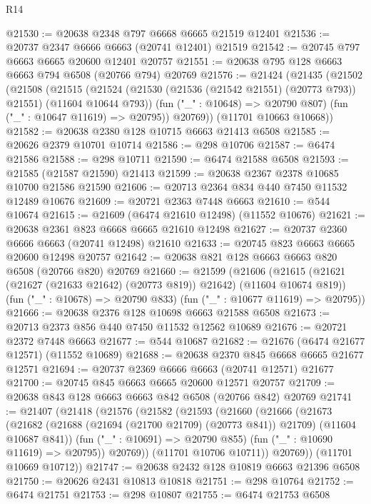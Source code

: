 \begin{lexlean}{R14}
\begin{coremodule}
@21530 := @20638 @2348 @797 @6668 @6665 @21519 @12401
@21536 := @20737 @2347 @6666 @6663 (@20741 @12401) @21519
@21542 := @20745 @797 @6663 @6665 @20600 @12401 @20757
@21551 := @20638 @795 @128 @6663 @6663 @794 @6508 (@20766 @794) @20769
@21576 := @21424
    (@21435
      (@21502
        (@21508
          (@21515
            (@21524 (@21530 (@21536 (@21542 @21551) (@20773 @793)) @21551) (@11604 @10644 @793))
            (fun ("_" : @10648) => @20790 @807)
            (fun ("_" : @10647 @11619) => @20795))
          @20769))
      (@11701 @10663 @10668))
@21582 := @20638 @2380 @128 @10715 @6663 @21413 @6508
@21585 := @20626 @2379 @10701 @10714
@21586 := @298 @10706
@21587 := @6474 @21586
@21588 := @298 @10711
@21590 := @6474 @21588 @6508
@21593 := @21585 (@21587 @21590) @21413
@21599 := @20638 @2367 @2378 @10685 @10700 @21586 @21590
@21606 := @20713 @2364 @834 @440 @7450 @11532 @12489 @10676
@21609 := @20721 @2363 @7448 @6663
@21610 := @544 @10674
@21615 := @21609 (@6474 @21610 @12498) (@11552 @10676)
@21621 := @20638 @2361 @823 @6668 @6665 @21610 @12498
@21627 := @20737 @2360 @6666 @6663 (@20741 @12498) @21610
@21633 := @20745 @823 @6663 @6665 @20600 @12498 @20757
@21642 := @20638 @821 @128 @6663 @6663 @820 @6508 (@20766 @820) @20769
@21660 := @21599
    (@21606
      (@21615 (@21621 (@21627 (@21633 @21642) (@20773 @819)) @21642) (@11604 @10674 @819))
      (fun ("_" : @10678) => @20790 @833)
      (fun ("_" : @10677 @11619) => @20795))
@21666 := @20638 @2376 @128 @10698 @6663 @21588 @6508
@21673 := @20713 @2373 @856 @440 @7450 @11532 @12562 @10689
@21676 := @20721 @2372 @7448 @6663
@21677 := @544 @10687
@21682 := @21676 (@6474 @21677 @12571) (@11552 @10689)
@21688 := @20638 @2370 @845 @6668 @6665 @21677 @12571
@21694 := @20737 @2369 @6666 @6663 (@20741 @12571) @21677
@21700 := @20745 @845 @6663 @6665 @20600 @12571 @20757
@21709 := @20638 @843 @128 @6663 @6663 @842 @6508 (@20766 @842) @20769
@21741 := @21407
    (@21418
      (@21576
        (@21582
          (@21593
            (@21660
              (@21666
                (@21673
                  (@21682
                    (@21688 (@21694 (@21700 @21709) (@20773 @841)) @21709)
                    (@11604 @10687 @841))
                  (fun ("_" : @10691) => @20790 @855)
                  (fun ("_" : @10690 @11619) => @20795))
                @20769))
            (@11701 @10706 @10711))
          @20769))
      (@11701 @10669 @10712))
@21747 := @20638 @2432 @128 @10819 @6663 @21396 @6508
@21750 := @20626 @2431 @10813 @10818
@21751 := @298 @10764
@21752 := @6474 @21751
@21753 := @298 @10807
@21755 := @6474 @21753 @6508

\end{coremodule}
\end{lexlean}

